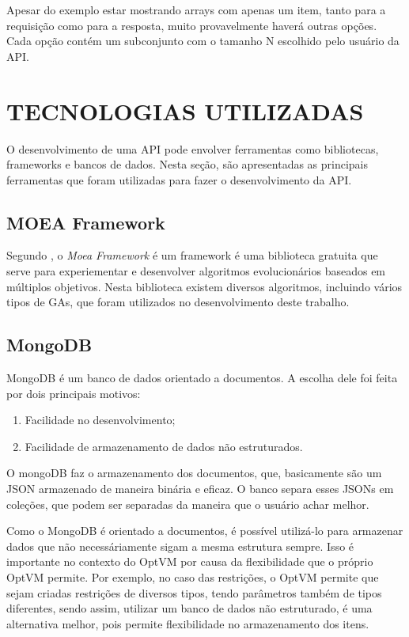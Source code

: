 Apesar do exemplo estar mostrando arrays com apenas um item,
tanto para a requisição como para a resposta, muito provavelmente 
haverá outras opções. Cada opção contém um subconjunto com o tamanho
N escolhido pelo usuário da API. 

\section{TECNOLOGIAS UTILIZADAS}

O desenvolvimento de uma API pode envolver ferramentas como bibliotecas, frameworks e 
bancos de dados. Nesta seção, são apresentadas as principais ferramentas que foram utilizadas para
fazer o desenvolvimento da API. 

\subsection{MOEA Framework}
Segundo \cite{moea}, o \textit{Moea Framework} é um framework é uma
biblioteca gratuita que serve para experiementar e desenvolver
algoritmos evolucionários baseados em múltiplos objetivos. Nesta biblioteca
existem diversos algoritmos, incluindo vários tipos de GAs, que foram utilizados
no desenvolvimento deste trabalho.

\subsection{MongoDB}
MongoDB é um banco de dados orientado a documentos. A escolha dele foi
feita por dois principais motivos:

\begin{enumerate}
  \item Facilidade no desenvolvimento;
  \item Facilidade de armazenamento de dados não estruturados.
\end{enumerate}

O mongoDB faz o armazenamento dos documentos, que, basicamente são um JSON
armazenado de maneira binária e eficaz. O banco separa esses JSONs em coleções,
que podem ser separadas da maneira que o usuário achar melhor.

Como o MongoDB é orientado a documentos, é possível utilizá-lo para armazenar
dados que não necessáriamente sigam a mesma estrutura sempre. Isso é importante no contexto do
OptVM por causa da flexibilidade que o próprio OptVM permite. Por exemplo, no
caso das restrições, o OptVM permite que sejam criadas restrições de diversos tipos,
tendo parâmetros também de tipos diferentes, sendo assim, utilizar um banco de 
dados não estruturado, é uma alternativa melhor, pois permite flexibilidade no armazenamento
dos itens.
